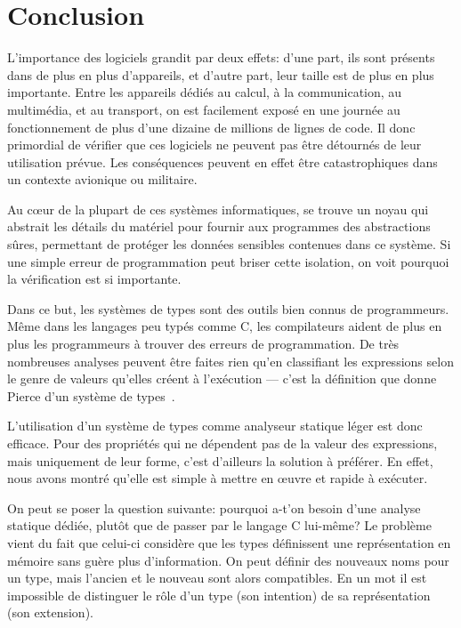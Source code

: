 
\section*{Conclusion}

L'importance des logiciels grandit par deux effets:
d'une part, ils sont présents dans de plus en plus d'appareils,
et d'autre part, leur taille est de plus en plus importante.
Entre les appareils dédiés au calcul, à la communication, au multimédia, et au
transport, on est facilement exposé en une journée au fonctionnement de plus
d'une dizaine de millions de lignes de code.
Il donc primordial de vérifier que ces logiciels ne peuvent pas être détournés
de leur utilisation prévue. Les conséquences peuvent en effet être
catastrophiques dans un contexte avionique ou militaire.

Au cœur de la plupart de ces systèmes informatiques, se trouve un noyau qui
abstrait les détails du matériel pour fournir aux programmes des abstractions
sûres, permettant de protéger les données sensibles contenues dans ce système.
Si une \linebreak simple erreur de programmation peut briser cette isolation, on
voit pourquoi la vérification est si importante.

Dans ce but, les systèmes de types sont des outils bien connus de programmeurs.
Même dans les langages peu typés comme C, les compilateurs aident de plus en
plus les programmeurs à trouver des erreurs de programmation. De très nombreuses
analyses peuvent être faites rien qu'en classifiant les expressions selon le
genre de valeurs qu'elles créent à l'exécution --- c'est la définition que donne
Pierce d'un système de types~\cite[p.~1]{TAPL}.

L'utilisation d'un système de types comme analyseur statique léger est donc
efficace. Pour des propriétés qui ne dépendent pas de la valeur des expressions,
mais uniquement de leur forme, c'est d'ailleurs la solution à préférer. En
effet, nous avons montré qu'elle est simple à mettre en œuvre et rapide à
exécuter.

On peut se poser la question suivante: pourquoi a-t'on besoin d'une analyse
statique dédiée, plutôt que de passer par le langage C lui-même? Le problème
vient du fait que celui-ci considère que les types définissent une
représentation en mémoire sans guère plus d'information. On peut définir des
nouveaux noms pour un type, mais l'ancien et le nouveau sont alors compatibles.
En un mot il est impossible de distinguer le rôle d'un type (son intention) de
sa représentation (son extension).

